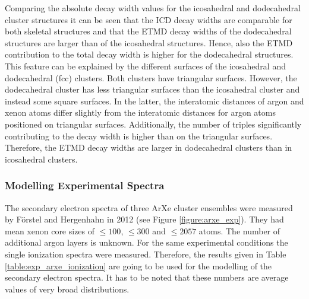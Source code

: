 Comparing the absolute decay width values for the icosahedral and dodecahedral
cluster structures it can be seen that the ICD decay widths are comparable
for both skeletal structures and that the ETMD decay widths of the dodecahedral
structures are larger than of the icosahedral structures. Hence, also the
ETMD contribution to the total decay width is higher for the dodecahedral
structures.
This feature can be explained by the different surfaces of the icosahedral
and dodecahedral (fcc) clusters. Both clusters have triangular surfaces.
However, the dodecahedral cluster has less triangular surfaces than the
icosahedral cluster and instead some square surfaces. In the latter, the
interatomic distances of argon and xenon atoms differ slightly
from the interatomic distances for argon atoms positioned on triangular surfaces.
Additionally, the number of triples significantly contributing to the
decay width is higher than on the triangular surfaces.
Therefore, the ETMD decay widths are larger
in dodecahedral clusters than in icosahedral clusters.



\subsubsection{Modelling Experimental Spectra}

The secondary electron spectra of three ArXe cluster ensembles were measured by
Förstel and Hergenhahn in 2012 (see Figure \ref{figure:arxe_exp}).
They had mean xenon core sizes
of $\le100$, $\le300$ and $\le2057$ atoms. The number of additional argon
layers is unknown.
For the same experimental conditions the single ionization spectra were
measured. Therefore, the results given in Table \ref{table:exp_arxe_ionization}
are going to be used for the modelling of the secondary electron spectra.
It has to be noted that these numbers are average values of very broad
distributions.


